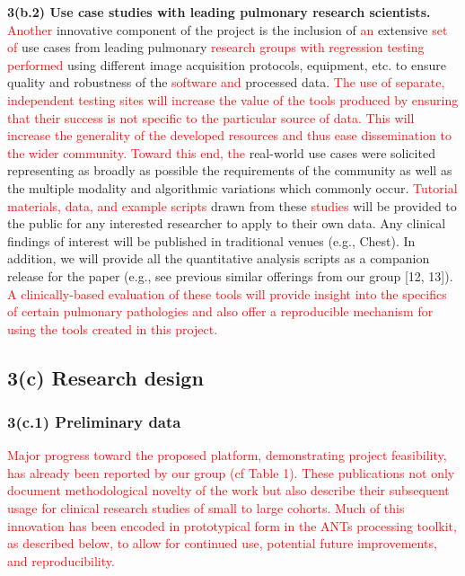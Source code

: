 \documentclass[11pt,]{article}
\begin{document}
\textbf{3(b.2) Use case studies with leading pulmonary research
scientists.} \textcolor{red}{Another} innovative component of the
project is the inclusion of \textcolor{red}{an} extensive
\textcolor{red}{set of} use cases from leading pulmonary
\textcolor{red}{research groups with regression testing performed} using
different image acquisition protocols, equipment, etc. to ensure quality
and robustness of the \textcolor{red}{software and} processed data.
\textcolor{red}{The use of separate, independent testing sites will increase the value of the
tools produced by ensuring that their success is not specific to the particular
source of data.  This will increase the generality of the developed resources and
thus ease dissemination to the wider community. Toward this end, the}
real-world use cases were solicited representing as broadly as possible
the requirements of the community as well as the multiple modality and
algorithmic variations which commonly occur.
\textcolor{red}{Tutorial materials, data, and example scripts} drawn
from these \textcolor{red}{studies} will be provided to the public for
any interested researcher to apply to their own data. Any clinical
findings of interest will be published in traditional venues (e.g.,
Chest). In addition, we will provide all the quantitative analysis
scripts as a companion release for the paper (e.g., see previous similar
offerings from our group {[}12, 13{]}).
\textcolor{red}{A clinically-based evaluation of these tools will provide insight into the specifics
of certain pulmonary pathologies
and also offer a reproducible mechanism for using the tools created in this project.}

\subsection{\texorpdfstring{\textbf{3(c) Research
design}}{3(c) Research design}}\label{c-research-design}

\subsubsection{3(c.1) Preliminary data}\label{c.1-preliminary-data}

\textcolor{red}{Major progress toward the proposed platform, demonstrating
project feasibility, has already been reported by our group (cf Table 1).
These publications not only document methodological novelty of the work but
also describe their subsequent usage for clinical research studies of small
to large cohorts.  Much of this innovation has been encoded in prototypical
form in the ANTs processing toolkit, as described below, to allow for continued
use, potential future improvements, and reproducibility.}
\end{document}
